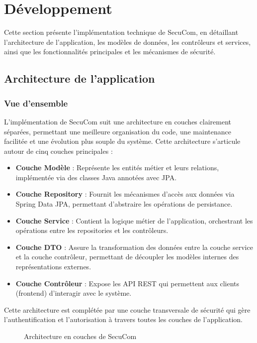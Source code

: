 \chapter{Développement}

Cette section présente l'implémentation technique de SecuCom, en détaillant l'architecture de l'application, les modèles de données, les contrôleurs et services, ainsi que les fonctionnalités principales et les mécanismes de sécurité.

\section{Architecture de l'application}

\subsection{Vue d'ensemble}

L'implémentation de SecuCom suit une architecture en couches clairement séparées, permettant une meilleure organisation du code, une maintenance facilitée et une évolution plus souple du système. Cette architecture s'articule autour de cinq couches principales :

\begin{itemize}
  \item \textbf{Couche Modèle} : Représente les entités métier et leurs relations, implémentée via des classes Java annotées avec JPA.
  \item \textbf{Couche Repository} : Fournit les mécanismes d'accès aux données via Spring Data JPA, permettant d'abstraire les opérations de persistance.
  \item \textbf{Couche Service} : Contient la logique métier de l'application, orchestrant les opérations entre les repositories et les contrôleurs.
  \item \textbf{Couche DTO} : Assure la transformation des données entre la couche service et la couche contrôleur, permettant de découpler les modèles internes des représentations externes.
  \item \textbf{Couche Contrôleur} : Expose les API REST qui permettent aux clients (frontend) d'interagir avec le système.
\end{itemize}

Cette architecture est complétée par une couche transversale de sécurité qui gère l'authentification et l'autorisation à travers toutes les couches de l'application.

\begin{figure}[h]
\centering
\caption{Architecture en couches de SecuCom}
\end{figure}

